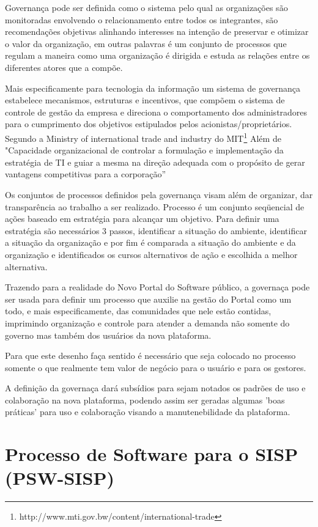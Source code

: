 Governança pode ser definida como o sistema pelo qual as organizações 
são monitoradas envolvendo o relacionamento entre todos os integrantes,
são recomendações objetivas alinhando interesses na intenção de preservar e 
otimizar o valor da organização, em outras palavras é um conjunto de processos
que regulam a maneira como uma organização é dirigida e estuda as relações entre 
os diferentes atores que a compõe.\cite{molinarogestao}

Mais especificamente para tecnologia da informação um sistema de governança
estabelece mecanismos, estruturas e incentivos, que compõem o sistema de controle de 
gestão da empresa e direciona o comportamento dos administradores para o cumprimento 
dos objetivos estipulados pelos acionistas/proprietários.\cite{martin2004governancca}
%
Segundo a Ministry of international trade and industry do MIT\footnote{http://www.mti.gov.bw/content/international-trade} 
Além de "Capacidade organizacional de controlar a formulação e implementação da 
estratégia de TI e guiar a mesma na direção adequada com o propósito de gerar 
vantagens competitivas para a corporação”

Os conjuntos de processos definidos pela governança visam além de organizar, 
dar transparência ao trabalho a ser realizado.
%
Processo é um conjunto seqüencial de ações baseado em estratégia para alcançar
um objetivo. Para definir uma estratégia são necessários 3 passos, identificar a
situação do ambiente, identificar a situação da organização e por fim é comparada
a situação do ambiente e da organização e identificados os cursos alternativos
de ação e escolhida a melhor alternativa.\cite{molinarogestao}

Trazendo para a realidade do Novo Portal do Software público, a governaça pode ser usada para 
definir um processo que auxilie na gestão do Portal como um todo, e mais especificamente,
das comunidades que nele estão contidas, imprimindo organização e controle para atender 
a demanda não somente do governo mas também dos usuários da nova plataforma.

Para que este desenho faça sentido é necessário que seja colocado no processo somente o que 
realmente tem valor de negócio para o usuário e para os gestores.

A definição da governaça dará subsídios para sejam notados os padrões de uso e colaboração na
nova plataforma, podendo assim ser geradas algumas 'boas práticas' para uso e colaboração
visando a manutenebilidade da plataforma.

\section{Processo de Software para o SISP (PSW-SISP)}

